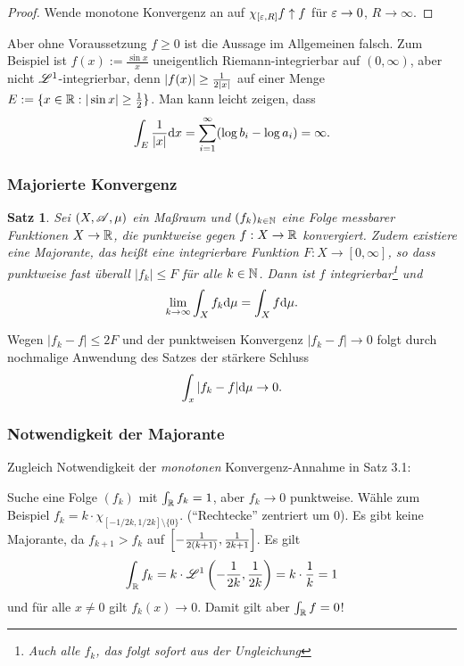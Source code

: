\documentclass[
 a4paper,
 12pt,
 parskip=half
 ]{scrartcl}
\theoremstyle{plain}
\newtheorem*{thm*}{Satz}
\theoremstyle{definition}
\numberwithin{equation}{section}
\begin{document}
\begin{proof}
 Wende monotone Konvergenz an auf $\chi_{[\varepsilon,R]} f \uparrow f$ für $\varepsilon \to 0$, $R \to \infty$.
\end{proof}

Aber ohne Voraussetzung $f \ge 0$ ist die Aussage im Allgemeinen falsch. Zum Beispiel ist $f(x) := \frac{\sin x}{x}$ uneigentlich Riemann-integrierbar auf $(0,\infty)$, aber nicht $\mathscr{L}^1$-integrierbar, denn $|f(x)| \ge \frac{1}{2 |x|}$ auf einer Menge $E := \{ x \in \mathbb{R}: |\sin x| \ge \frac{1}{2} \}$. Man kann leicht zeigen, dass
\[ \int_E \frac{1}{|x|} \mathrm{d} x = \sum_{i=1}^\infty ( \log b_i - \log a_i ) = \infty. \]

\subsubsection{Majorierte Konvergenz}
\begin{thm*}
 Sei $(X, \mathscr{A}, \mu)$ ein Maßraum und $(f_k)_{k \in \mathbb{N}}$ eine Folge messbarer Funktionen $X \to \mathbb{R}$, die \emph{punktweise} gegen $f:X \to \mathbb{R}$ konvergiert. Zudem existiere eine Majorante, das heißt eine \emph{integrierbare} Funktion $F: X \to [0, \infty]$, so dass punktweise fast überall $|f_k| \le F$ für alle $k \in \mathbb{N}$. Dann ist $f$ integrierbar\footnote{Auch alle $f_k$, das folgt sofort aus der Ungleichung} und
 \[ \lim_{k \to \infty} \int_X f_k \mathrm{d} \mu = \int_X f \mathrm{d} \mu. \]
\end{thm*}

\begin{bem}
 Wegen $|f_k -f| \le 2F$ und der punktweisen Konvergenz $|f_k - f| \to 0$ folgt durch nochmalige Anwendung des Satzes der stärkere Schluss
 \[ \int_x |f_k - f| \mathrm{d} \mu \to 0. \]
\end{bem}

\subsubsection*{Notwendigkeit der Majorante}
Zugleich Notwendigkeit der \emph{monotonen} Konvergenz-Annahme in Satz 3.1:

Suche eine Folge $(f_k)$ mit $\int_{\mathbb{R}} f_k = 1$, aber $f_k \to 0$ punktweise. Wähle zum Beispiel $f_k = k \cdot \chi_{[-1/2k,1/2k]\setminus \{ 0 \}}$. (``Rechtecke'' zentriert um 0). Es gibt keine Majorante, da $f_{k+1} > f_k$ auf $\left[ -\frac{1}{2(k+1)}, \frac{1}{2k+1} \right]$. Es gilt
\[ \int_{\mathbb{R}} f_k = k \cdot \mathscr{L}^1 \left( -\frac{1}{2k}, \frac{1}{2k} \right) = k \cdot \frac{1}{k} = 1 \]
und für alle $x \ne 0$ gilt $f_k(x) \to 0$. Damit gilt aber $\int_{\mathbb{R}} f = 0$!
\end{document}
